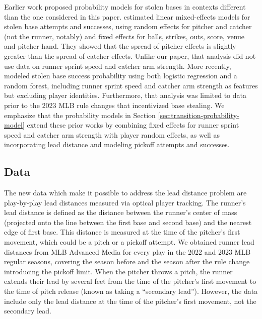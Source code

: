 \documentclass[aoas]{imsart}
\begin{document}
    Earlier work proposed probability models for stolen bases in contexts different than the one considered in this paper. \citet{loughin_assessing_2008} estimated linear mixed-effects models for stolen base attempts and successes, using random effects for pitcher and catcher (not the runner, notably) and fixed effects for balls, strikes, outs, score, venue and pitcher hand. They showed that the spread of pitcher effects is slightly greater than the spread of catcher effects. Unlike our paper, that analysis did not use data on runner sprint speed and catcher arm strength. More recently, \citet{stanley_modeling_2023} modeled stolen base success probability using both logistic regression and a random forest, including runner sprint speed and catcher arm strength as features but excluding player identities. Furthermore, that analysis was limited to data prior to the 2023 MLB rule changes that incentivized base stealing. We emphasize that the probability models in Section \ref{sec:transition-probability-model} extend these prior works by combining fixed effects for runner sprint speed and catcher arm strength with player random effects, as well as incorporating lead distance and modeling pickoff attempts and successes.
  
  \subsection{Data}

    The new data which make it possible to address the lead distance problem are play-by-play lead distances measured via optical player tracking. The runner's lead distance is defined as the distance between the runner's center of mass (projected onto the line between the first base and second base) and the nearest edge of first base. This distance is measured at the time of the pitcher's first movement, which could be a pitch or a pickoff attempt. We obtained runner lead distances from MLB Advanced Media for every play in the 2022 and 2023 MLB regular seasons, covering the season before and the season after the rule change introducing the pickoff limit. When the pitcher throws a pitch, the runner extends their lead by several feet from the time of the pitcher's first movement to the time of pitch release (known as taking a ``secondary lead''). However, the data include only the lead distance at the time of the pitcher's first movement, not the secondary lead.
\end{document}
